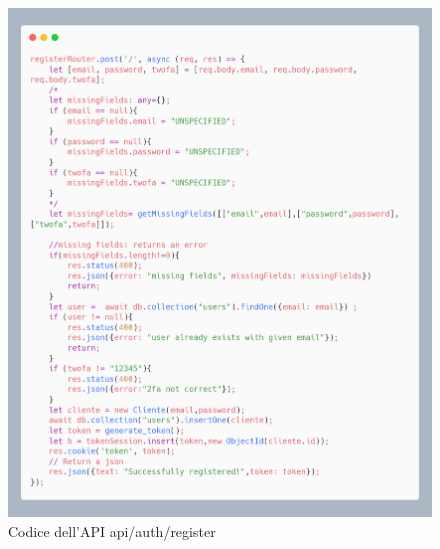 \documentclass{report}
\begin{document}
\begin{figure}[H]
	\centering\includegraphics[width=1\textwidth]{images/microservizio-autenticazione/register-carbon.png}
	Codice dell'API api/auth/register
\end{figure}
\end{document}
